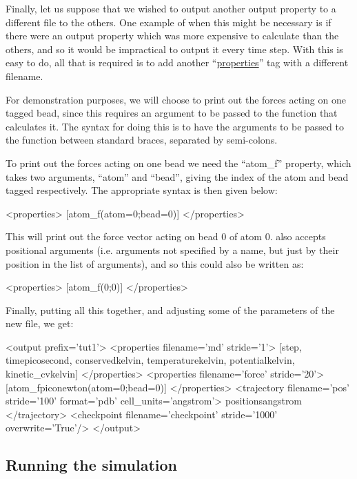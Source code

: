 \documentclass[11pt,english,fleqn]{report}
\newenvironment{code}{%
\footnotesize 
\verbatim
}{
\endverbatim
\normalsize
}
\begin{document}
Finally, let us suppose that we wished to output another output property
to a different file to the others. One example of when this 
might be necessary is if there
were an output property which was more expensive to calculate than the
others, and so it would be impractical to output it every time step.
With \ipi this is easy to do, all that is required is to add another
{}``\hyperref[PROPERTIES]{properties}'' tag with a different filename.

For demonstration purposes, we will choose to print out the forces
acting on one tagged bead, since this requires an argument to be
passed to the function that calculates it. The \ipi syntax for doing this is to have
the arguments to be passed to the function between standard braces,
separated by semi-colons.

To print out the forces acting on one bead we need the {}``atom\_f''
property, which takes two arguments, {}``atom'' and {}``bead'',
giving the index of the atom and bead tagged respectively. The
appropriate syntax is then given below:

\begin{code}
<properties> 
   [atom_f(atom=0;bead=0)] 
</properties>
\end{code}

This will print out the force vector acting on bead 0 of atom 0.
\ipi also accepts positional arguments
(i.e. arguments not specified by a name, but just by their position
in the list of arguments), and so this could also be written as:

\begin{code}
<properties> 
   [atom_f(0;0)] 
</properties>
\end{code}

Finally, putting all this together, and adjusting some
of the parameters of the new file, we get:

\begin{code}
<output prefix='tut1'>
   <properties filename='md' stride='1'> 
      [step, time{picosecond}, conserved{kelvin}, 
       temperature{kelvin}, potential{kelvin}, kinetic_cv{kelvin}] 
   </properties>
   <properties filename='force' stride='20'> 
      [atom_f{piconewton}(atom=0;bead=0)] 
   </properties>
   <trajectory filename='pos' stride='100' format='pdb' cell_units='angstrom'> 
      positions{angstrom} 
   </trajectory>
   <checkpoint filename='checkpoint' stride='1000' overwrite='True'/>
</output>
\end{code}

\subsection{Running the simulation}
\end{document}
